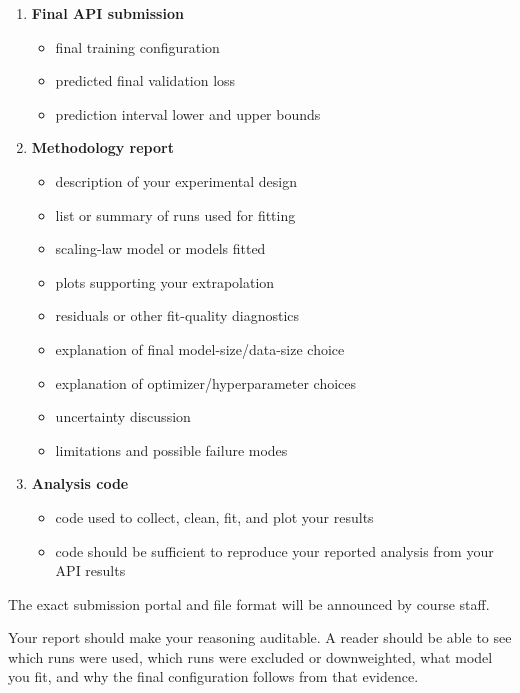 \documentclass[
  11pt,
]{article}
\providecommand{\tightlist}{%
  \setlength{\itemsep}{0pt}\setlength{\parskip}{0pt}}
\begin{document}
\begin{enumerate}
\def\labelenumi{\arabic{enumi}.}
\tightlist
\item
  \textbf{Final API submission}

  \begin{itemize}
  \tightlist
  \item
    final training configuration
  \item
    predicted final validation loss
  \item
    prediction interval lower and upper bounds
  \end{itemize}
\item
  \textbf{Methodology report}

  \begin{itemize}
  \tightlist
  \item
    description of your experimental design
  \item
    list or summary of runs used for fitting
  \item
    scaling-law model or models fitted
  \item
    plots supporting your extrapolation
  \item
    residuals or other fit-quality diagnostics
  \item
    explanation of final model-size/data-size choice
  \item
    explanation of optimizer/hyperparameter choices
  \item
    uncertainty discussion
  \item
    limitations and possible failure modes
  \end{itemize}
\item
  \textbf{Analysis code}

  \begin{itemize}
  \tightlist
  \item
    code used to collect, clean, fit, and plot your results
  \item
    code should be sufficient to reproduce your reported analysis from
    your API results
  \end{itemize}
\end{enumerate}

The exact submission portal and file format will be announced by course
staff.

Your report should make your reasoning auditable. A reader should be
able to see which runs were used, which runs were excluded or
downweighted, what model you fit, and why the final configuration
follows from that evidence.
\end{document}
